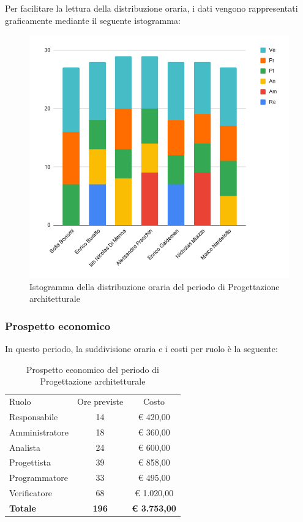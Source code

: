 \documentclass[../piano-di-progetto.tex]{subfiles}
\begin{document}
  Per facilitare la lettura della distribuzione oraria, i dati vengono rappresentati graficamente mediante il seguente istogramma:
  \begin{figure}[H]
    \centering
    \includegraphics[width=12cm]{img/ore-progettazione.png}
    \caption{Istogramma della distribuzione oraria del periodo di Progettazione architetturale}
    \label{fig:ore-componente-progettazione}
  \end{figure}

  \subsubsection{Prospetto economico}
  In questo periodo, la suddivisione oraria e i costi per ruolo è la seguente:

  \begin{table}[H]
    \centering
    \begin{tabular}{lcc}
      Ruolo           & Ore previste & Costo               \\
      Responsabile    & 14           & € 420,00            \\
      Amministratore  & 18           & € 360,00            \\
      Analista        & 24           & € 600,00            \\
      Progettista     & 39           & € 858,00            \\
      Programmatore   & 33           & € 495,00            \\
      Verificatore    & 68           & € 1.020,00          \\
      \textbf{Totale} & \textbf{196} & \textbf{€ 3.753,00}
    \end{tabular}
    \caption{Prospetto economico del periodo di Progettazione architetturale}
  \end{table}
\end{document}
